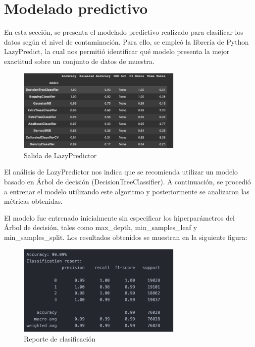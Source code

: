 \section{Modelado predictivo}

En esta sección, se presenta el modelado predictivo realizado para clasificar los datos según el nivel de contaminación. Para ello, se empleó la librería de Python LazyPredict\cite{LazyPredict}, la cual nos permitió identificar qué modelo presenta la mejor exactitud sobre un conjunto de datos de muestra.

\begin{figure}[htb] 
    \begin{center} 
        \includegraphics[width=8cm]{Papper IB/Images/model_1.png}
    \end{center} 
    \caption{Salida de LazyPredictor} 
    \label{fig:fig4} 
\end{figure} 

El análisis de LazyPredictor nos indica que se recomienda utilizar un modelo basado en Árbol de decisión (DecisionTreeClassifier). A continuación, se procedió a entrenar el modelo utilizando este algoritmo y posteriormente se analizaron las métricas obtenidas.

El modelo fue entrenado inicialmente sin especificar los hiperparámetros del Árbol de decisión, tales como max\_depth, min\_samples\_leaf y min\_samples\_split. Los resultados obtenidos se muestran en la siguiente figura:

\begin{figure}[htb] 
    \begin{center} 
        \includegraphics[width=8cm]{Papper IB/Images/model_2.png}
    \end{center} 
    \caption{Reporte de clasificación} 
    \label{fig:fig2} 
\end{figure} 

